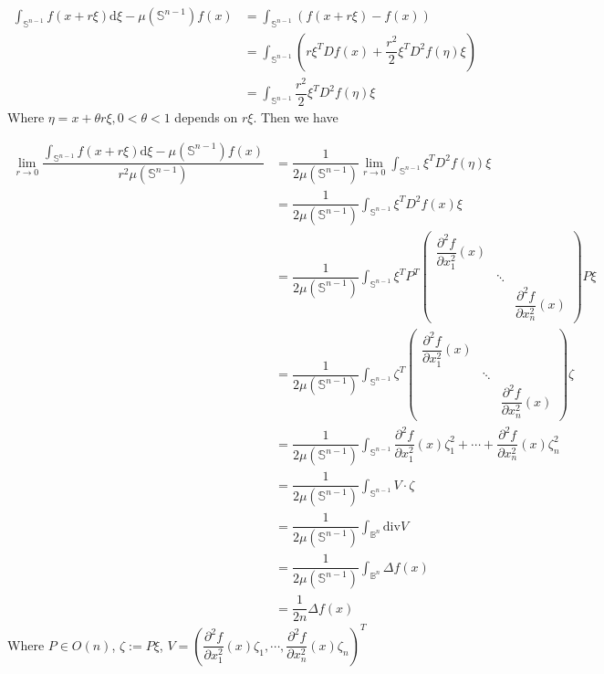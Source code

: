 \documentclass[../main.tex]{subfiles}
\begin{document}
\begin{solution}
\[
\begin{aligned}
\int_{\mathbb{S}^{n-1}}f(x+r\xi)\mathrm{d}\xi-\mu(\mathbb{S}^{n-1})f(x)
&=\int_{\mathbb{S}^{n-1}}\left(f(x+r\xi)-f(x)\right) \\
&=\int_{\mathbb{S}^{n-1}}\left(r\xi^{T}Df(x)+\dfrac{r^{2}}{2}\xi^{T}D^{2}f(\eta)\xi\right) \\
&=\int_{\mathbb{S}^{n-1}}\dfrac{r^{2}}{2}\xi^{T}D^{2}f(\eta)\xi
\end{aligned}
\]
Where \(\eta=x+\theta r\xi, 0<\theta<1\) depends on \(r\xi\).  Then we have\par
\[
\begin{aligned}
\lim_{r\rightarrow 0}\dfrac{\int_{\mathbb{S}^{n-1}}f(x+r\xi)\mathrm{d}\xi-\mu(\mathbb{S}^{n-1})f(x)}{r^{2}\mu(\mathbb{S}^{n-1})} 
&=\dfrac{1}{2\mu(\mathbb{S}^{n-1})}\lim_{r\rightarrow 0}\int_{\mathbb{S}^{n-1}}\xi^{T}D^{2}f(\eta)\xi \\
&=\dfrac{1}{2\mu(\mathbb{S}^{n-1})}\int_{\mathbb{S}^{n-1}}\xi^{T}D^{2}f(x)\xi \\
&=\dfrac{1}{2\mu(\mathbb{S}^{n-1})}\int_{\mathbb{S}^{n-1}}\xi^{T}P^{T}
\begin{pmatrix}
\dfrac{\partial^{2}f}{\partial x_{1}^{2}}(x) &  & \\ 
 & \ddots  & \\ 
 &  & \dfrac{\partial^{2}f}{\partial x_{n}^{2}}(x)
\end{pmatrix}
P\xi \\
&=\dfrac{1}{2\mu(\mathbb{S}^{n-1})}\int_{\mathbb{S}^{n-1}}\zeta^{T}
\begin{pmatrix}
\dfrac{\partial^{2}f}{\partial x_{1}^{2}}(x) &  & \\ 
 & \ddots  & \\ 
 &  & \dfrac{\partial^{2}f}{\partial x_{n}^{2}}(x)
\end{pmatrix}
\zeta \\
&=\dfrac{1}{2\mu(\mathbb{S}^{n-1})}\int_{\mathbb{S}^{n-1}}\dfrac{\partial^{2}f}{\partial x_{1}^{2}}(x)\zeta_{1}^{2}+\cdots+\dfrac{\partial^{2}f}{\partial x_{n}^{2}}(x)\zeta_{n}^{2} \\
&= \dfrac{1}{2\mu(\mathbb{S}^{n-1})}\int_{\mathbb{S}^{n-1}}V \cdot \zeta \\
&= \dfrac{1}{2\mu(\mathbb{S}^{n-1})}\int_{\mathbb{B}^{n}}\mathrm{div}V \\
&= \dfrac{1}{2\mu(\mathbb{S}^{n-1})}\int_{\mathbb{B}^{n}}\Delta f(x) \\
&= \dfrac{1}{2n}\Delta f(x)
\end{aligned}
\]
Where \(P\in O(n)\), \(\zeta:=P\xi\), \(V=\left(\dfrac{\partial^{2}f}{\partial x_{1}^{2}}(x)\zeta_{1}, \cdots, \dfrac{\partial^{2}f}{\partial x_{n}^{2}}(x)\zeta_{n}\right)^{T}\) 
\end{solution}
\end{document}

